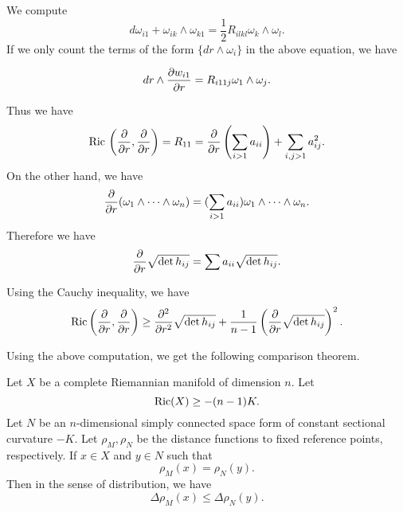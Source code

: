 We compute
%
\[ d \omega _{i1} + \omega _{ik}  \wedge \omega _{k 1} = \frac{1}{2} R_{il  kl} \omega _k \wedge \omega _l .\]
%
If we only count the terms of the form $ \{ d r \wedge \omega_i \} $  in the above equation, we have

\[
dr\wedge\frac{\partial w_{i1}}{\partial r}=R_{i11j}\omega_1\wedge\omega_j.
\]

Thus we have
\[
{\rm Ric}\,\left(\frac{\partial}{\partial r}, \frac{\partial}{\partial r}\right)=R_{11}=\frac{\partial}{\partial r}\left(\sum_{i>1}a_{ii}\right)
+\sum_{i,j>1}a_{ij}^2.
\]
On the other hand, we have
\[
\frac{\partial}{\partial r}(\omega_1\wedge\cdots\wedge\omega_n)=(\sum_{i>1} a_{ii})\omega_1\wedge\cdots\wedge\omega_n.
\]
Therefore we have
\[
{\partial\over \partial
 r} \sqrt{\det h_{ij}}  =\sum a_{ii}  \sqrt{\det h_{ij}}.
 \]
 
 Using the Cauchy inequality, we have
 \begin{equation}\label{1}
 {\rm Ric} \left( \frac{\partial }{\partial r}, \frac{\partial }{\partial r} \right) \geq\frac{\partial^2}{\partial r^2}\sqrt{\det h_{ij}}+\frac{1}{n-1}\left(\frac{\partial}{\partial r}\sqrt{\det h_{ij}}\right)^2.
 \end{equation}
 
 Using the above computation, we get the following comparison theorem.

\begin{theorem} Let $X$ be a complete Riemannian manifold of dimension $n$. Let
\[{\rm Ric} (X) \geq - (n - 1) K .\]
%
Let $N$ be an $n$-dimensional simply connected space form of constant sectional curvature $ -K $. Let $ \rho_M, \rho_N $ be the distance functions to fixed reference points, respectively. If $ x \in X $ and $ y \in N $ such that 
%
\[ \rho_M (x) = \rho _N (y) .\]
%
Then in the sense of distribution, we have 
\[ \Delta \rho _M (x) \leq \Delta \rho _N (y). \]
\end{theorem}

